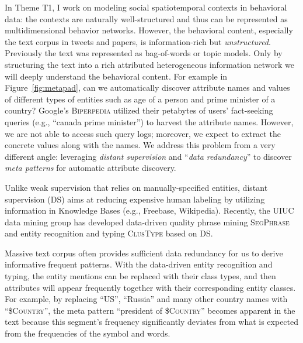 \documentclass[10.5pt]{article}
\begin{document}
In Theme T1, I work on modeling social spatiotemporal contexts in behavioral data: the contexts are naturally well-structured and thus can be represented as multidimensional behavior networks. However, the behavioral content, especially the text corpus in tweets and papers, is information-rich but \textit{unstructured}. Previously the text was represented as bag-of-words or topic models. Only by structuring the text into a rich attributed heterogeneous information network we will deeply understand the behavioral content. For example in Figure~\ref{fig:metapad}, can we automatically discover attribute names and values of different types of entities such as age of a person and prime minister of a country? Google's \textsc{Biperpedia} \cite{gupta2014biperpedia} utilized their petabytes of users' fact-seeking queries (e.g., ``canada prime minister'') to harvest the attribute names. However, we are not able to access such query logs; moreover, we expect to extract the concrete values along with the names. We address this problem from a very different angle: leveraging \textit{distant supervision} and ``\textit{data redundancy}'' to discover \textit{meta patterns} for automatic attribute discovery.
\begin{compactitem}
\item Unlike weak supervision that relies on manually-specified entities, distant supervision (DS) aims at reducing expensive human labeling by utilizing information in Knowledge Bases (e.g., Freebase, Wikipedia). Recently, the UIUC data mining group has developed data-driven quality phrase mining \textsc{SegPhrase} \cite{liu2015mining} and entity recognition and typing \textsc{ClusType} \cite{ren2015clustype} based on DS.
\item Massive text corpus often provides sufficient data redundancy for us to derive informative frequent patterns. With the data-driven entity recognition and typing, the entity mentions can be replaced with their class types, and then attributes will appear frequently together with their corresponding entity classes. For example, by replacing ``US'', ``Russia'' and many other country names with ``\$\textsc{Country}'', the meta pattern ``president of \$\textsc{Country}'' becomes apparent in the text because this segment's frequency significantly deviates from what is expected from the frequencies of the symbol and words. 
\end{compactitem}
\end{document}
